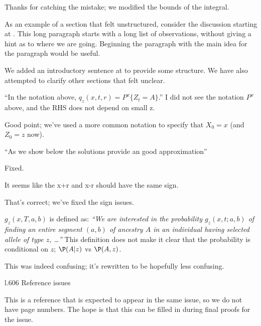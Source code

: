 \reply
Thanks for catching the mistake; we modified the bounds of the integral.

\begin{point}{}
As an example of a section that felt unstructured, consider the discussion starting at \revref.  This long paragraph starts with a long list of observations, without giving a hint as to where we are going. Beginning the paragraph with the main idea for the paragraph would be useful.
\end{point}

\reply
We added an introductory sentence at \revref{} 
to provide some structure. 
We have also attempted to clarify other sections that felt unclear.

\begin{point}{\revref}
``In the notation above, $q_z(x, t, r) = P^x\{Z_t = A\}$.''
I did not see the notation $P^x$ above, and the RHS does not depend on small z.
\end{point}

\reply
Good point; we've used a more common notation to specify that $X_0=x$ (and $Z_0=z$ now).

\begin{point}{} 
``As we show below the solutions provide an good approximation''
\end{point}

\reply
Fixed.

\begin{point}{\revref}
It seems like the x+r and x-r should have the same sign.
\end{point}

\reply
That's correct; we've fixed the sign issues.

\begin{point}{\revref}
$g_z(x, T, a,b)$ is defined as: \textit{``We are interested in the probability $g_z(x, t; a, b)$ of finding an entire segment $(a, b)$ of ancestry $A$ in an individual having selected allele of type $z$, \ldots ''}
This definition does not make it clear that the probability is conditional on $z$; $\P(A|z)$ vs $\P(A,z)$.
\end{point}

\reply
This was indeed confusing; it's rewritten to be hopefully less confusing.

\begin{point}{l.606}
Reference issues
\end{point}

\reply
This is a reference that is expected to appear in the same issue, so we do not have page numbers. The hope is that this can be filled in during final proofs for the issue.




